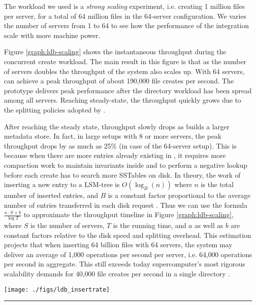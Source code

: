 The workload we used is a \textit{strong scaling} experiment, i.e.
creating 1 million files per server, for a total of 64 million files in the
64-server configuration. We varies the number of servers from 1 to 64
to see how the performance of the integration scale with more machine power.

Figure \ref{graph:ldb-scaling} shows the instantaneous throughput
during the concurrent create workload.
The main result in this figure is that as the number of servers doubles the
throughput of the system also scales up. With 64 servers, \giga can achieve a
peak throughput of about 190,000 file creates per second.
The prototype delivers peak performance after the directory workload
has been spread among all servers.
Reaching steady-state, the throughput quickly grows
due to the splitting policies adopted by \giga.

After reaching the steady state, throughput slowly drops
as \tfs builds a larger metadata store.
In fact, in large setups with 8 or more servers,
the peak throughput drops by as much as 25\% (in case of the 64-server setup).
This is because when there are more entries already existing in \tfs,
it requires more compaction work to maintain invariants inside \ldb
and to perform a negative lookup before each create
has to search more SSTables on disk.
In theory, the work of inserting a new entry to a LSM-tree is $O(\log_{B}(n))$
where $n$ is the total number of inserted entries, and $B$ is a constant factor
proportional to the average number of entries transferred in each disk request
\cite{Bender2007}.
Thus we can use the formula $\frac{a\cdot S+b}{\log{T}}$ to
approximate the throughput timeline in Figure \ref{graph:ldb-scaling},
where $S$ is the number of servers, $T$ is the running time,
and $a$ as well as $b$ are constant factors
relative to the disk speed and splitting overhead.
This estimation projects that when inserting 64 billion files with 64 servers,
the system may deliver an average of 1,000 operations per second per server,
i.e. 64,000 operations per second in aggregate.
This still exceeds today supercomputer's most rigorous scalability demands for
40,000 file creates per second in a single directory \cite{hpcs-io:2008}.

\begin{figure*}[t]
\centerline{\texttt{[image: ./figs/ldb\_insertrate]}}
\vspace{10pt}
\caption{\normalsize
\textit{Our middleware metadata service prototype shows promising scalability
up to 64 servers.
Note that at the end of the experiment,
the throughput drops to zero
because clients stop creating files as they finish 1 million files per client.
And the solid lines in each configuration are Bezier
curves to smooth the variability.}
}
\vspace{10pt}
\hrule
\label{graph:ldb-scaling}
\end{figure*}


